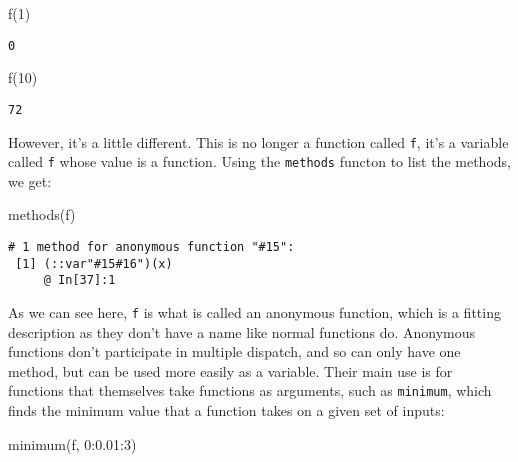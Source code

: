 \documentclass[
  letterpaper,
  DIV=11,
  numbers=noendperiod]{scrreprt}
\newenvironment{Shaded}{\begin{snugshade}}{\end{snugshade}}
\newcommand{\FloatTok}[1]{\textcolor[rgb]{0.68,0.00,0.00}{#1}}
\newcommand{\FunctionTok}[1]{\textcolor[rgb]{0.28,0.35,0.67}{#1}}
\newcommand{\NormalTok}[1]{\textcolor[rgb]{0.00,0.23,0.31}{#1}}
\newcommand{\OperatorTok}[1]{\textcolor[rgb]{0.37,0.37,0.37}{#1}}
\begin{document}
\begin{Shaded}
\begin{Highlighting}[]
\FunctionTok{f}\NormalTok{(}\FloatTok{1}\NormalTok{)}
\end{Highlighting}
\end{Shaded}

\begin{verbatim}
0
\end{verbatim}

\begin{Shaded}
\begin{Highlighting}[]
\FunctionTok{f}\NormalTok{(}\FloatTok{10}\NormalTok{)}
\end{Highlighting}
\end{Shaded}

\begin{verbatim}
72
\end{verbatim}

However, it's a little different. This is no longer a function called
\texttt{f}, it's a variable called \texttt{f} whose value is a function.
Using the \texttt{methods} functon to list the methods, we get:

\begin{Shaded}
\begin{Highlighting}[]
\FunctionTok{methods}\NormalTok{(f)}
\end{Highlighting}
\end{Shaded}

\begin{verbatim}
# 1 method for anonymous function "#15":
 [1] (::var"#15#16")(x)
     @ In[37]:1
\end{verbatim}

As we can see here, \texttt{f} is what is called an anonymous function,
which is a fitting description as they don't have a name like normal
functions do. Anonymous functions don't participate in multiple
dispatch, and so can only have one method, but can be used more easily
as a variable. Their main use is for functions that themselves take
functions as arguments, such as \texttt{minimum}, which finds the
minimum value that a function takes on a given set of inputs:

\begin{Shaded}
\begin{Highlighting}[]
\FunctionTok{minimum}\NormalTok{(f, }\FloatTok{0}\OperatorTok{:}\FloatTok{0.01}\OperatorTok{:}\FloatTok{3}\NormalTok{)}
\end{Highlighting}
\end{Shaded}
\end{document}
